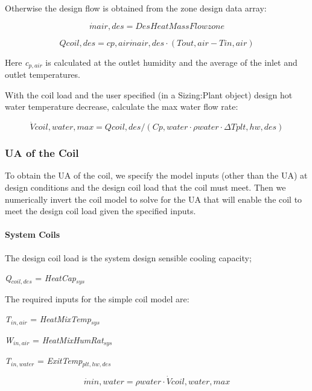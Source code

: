 Otherwise the design flow is obtained from the zone design data array:

\begin{equation}
\dot mair,des = DesHeatMassFlowzone
\end{equation}

\begin{equation}
Qcoil,des = cp,air\dot mair,des\cdot (Tout,air - Tin,air)
\end{equation}

Here \emph{c\(_{p,air}\)} is calculated at the outlet humidity and the average of the inlet and outlet temperatures.

With the coil load and the user specified (in a Sizing:Plant object) design hot water temperature decrease, calculate the max water flow rate:

\begin{equation}
\dot Vcoil,water,max = Qcoil,des/(Cp,water\cdot \rho water\cdot \Delta Tplt,hw,des)
\end{equation}

\subsubsection{UA of the Coil}\label{ua-of-the-coil}

To obtain the UA of the coil, we specify the model inputs (other than the UA) at design conditions and the design coil load that the coil must meet. Then we numerically invert the coil model to solve for the UA that will enable the coil to meet the design coil load given the specified inputs.

\paragraph{System Coils}\label{system-coils-1}

The design coil load is the system design sensible cooling capacity;

\emph{Q\(_{coil,des}\)} = \emph{HeatCap\(_{sys}\)}

The required inputs for the simple coil model are:

\emph{T\(_{in,air}\)} = \emph{HeatMixTemp\(_{sys}\)}

\emph{W\(_{in,air}\)} = \emph{HeatMixHumRat\(_{sys}\)}

\emph{T\(_{in,water}\)} = \emph{ExitTemp\(_{plt,hw,des}\)}

\begin{equation}
\dot min,water = \rho water\cdot \dot Vcoil,water,max
\end{equation}

